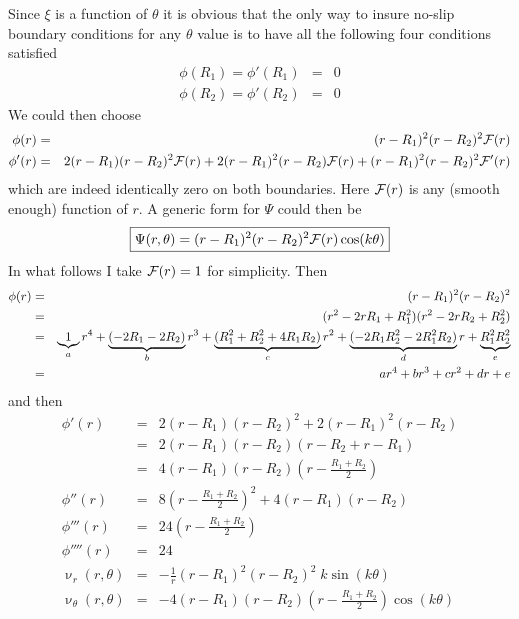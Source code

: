 Since $\xi$ is a function of $\theta$ it is obvious that the only way to insure no-slip boundary conditions for any $\theta$ value is to have all the following four conditions satisfied
\begin{eqnarray}
\phi(R_1)=\phi'(R_1) &=& 0 \\
\phi(R_2)=\phi'(R_2) &=& 0 
\end{eqnarray}
We could then choose
\begin{eqnarray}
\phi(r)&=&(r-R_1)^2(r-R_2)^2 {\cal F}(r) \\
\phi'(r)&=&2(r-R_1)(r-R_2)^2 {\cal F}(r)  +2(r-R_1)^2(r-R_2) {\cal F}(r) +(r-R_1)^2(r-R_2)^2 {\cal F}'(r)
\end{eqnarray}
which are indeed identically zero on both boundaries. Here ${\cal F}(r)$ is any (smooth enough) function of $r$.
A generic form for $\Psi$ could then be
\[
\boxed{
\Psi(r,\theta) = (r-R_1)^2(r-R_2)^2 {\cal F}(r) \cos(k\theta)
}
\]
In what follows I take ${\cal F}(r)=1$ for simplicity.
Then 
\begin{eqnarray}
\phi(r)&=&(r-R_1)^2(r-R_2)^2  \nonumber\\
&=& (r^2-2rR_1 + R_1^2)(r^2-2rR_2+R_2^2)\nonumber\\
&=& \underbrace{1}_{a} r^4 + \underbrace{(-2R_1 -2R_2)}_{b}r^3 + \underbrace{(R_1^2+R_2^2+4R_1R_2)}_{c}r^2 
+ \underbrace{(-2R_1R_2^2-2R_1^2R_2)}_{d}r + \underbrace{R_1^2R_2^2}_{e} \nonumber\\
&=& ar^4 + br^3 + cr^2 + dr + e
\end{eqnarray}    
and then
\begin{eqnarray}
\phi'(r)&=&2(r-R_1)(r-R_2)^2 +2(r-R_1)^2(r-R_2) \\
        &=&2(r-R_1)(r-R_2) (r-R_2+r-R_1) \\
        &=&4(r-R_1)(r-R_2) \left(r-\frac{R_1+R_2}{2}\right) \\
\phi''(r) &=& 8   \left(r-\frac{R_1+R_2}{2}\right)^2  + 4(r-R_1)(r-R_2)\\
\phi'''(r) &=& 24 \left(r-\frac{R_1+R_2}{2}\right) \\
\phi''''(r) &=& 24 \\
\upnu_r(r,\theta) &=& -\frac{1}{r} (r-R_1)^2(r-R_2)^2 \;  k \sin(k \theta)  \\
\upnu_\theta(r,\theta) 
&=&  - 4(r-R_1)(r-R_2) \left(r-\frac{R_1+R_2}{2}\right) \cos(k\theta)
\end{eqnarray}


